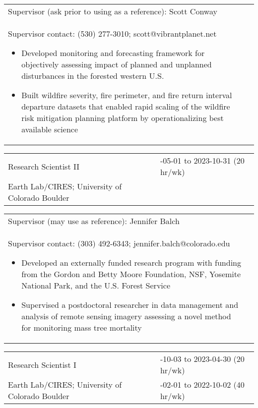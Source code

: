 \documentclass[10pt,english]{article}
\providecommand{\tabularnewline}{\\}
\begin{document}
\renewcommand{\arraystretch}{1.2}
\begin{tabularx}{\textwidth}{@{}>{\raggedright}p{6.25in} >{\raggedleft}X@{}}
\addtolength{\leftskip}{5ex}Supervisor (ask prior to using as a reference): Scott Conway \tabularnewline
\addtolength{\leftskip}{5ex}Supervisor contact: (530) 277-3010; scott@vibrantplanet.net
\begin{itemize}
\itemsep0em
\item{Developed monitoring and forecasting framework for objectively assessing impact of planned and unplanned disturbances in the forested western U.S.}
\item{Built wildfire severity, fire perimeter, and fire return interval departure datasets that enabled rapid scaling of the wildfire risk mitigation planning platform by operationalizing best available science}
\end{itemize}
\end{tabularx}

\renewcommand{\arraystretch}{1.2}
\begin{tabularx}{\textwidth}{@{}>{\raggedright}p{3.75in} >{\raggedleft}X@{}}
Research Scientist II & 2023-05-01 to 2023-10-31 (20 hr/wk) \tabularnewline
Earth Lab/CIRES; University of Colorado Boulder & \tabularnewline
\end{tabularx}

\renewcommand{\arraystretch}{1.2}
\begin{tabularx}{\textwidth}{@{}>{\raggedright}p{6.25in} >{\raggedleft}X@{}}
\addtolength{\leftskip}{5ex}Supervisor (may use as reference): Jennifer Balch \tabularnewline
\addtolength{\leftskip}{5ex}Supervisor contact: (303) 492-6343; jennifer.balch@colorado.edu
\begin{itemize}
\itemsep0em
\item{Developed an externally funded research program with funding from the Gordon and Betty Moore Foundation, NSF, Yosemite National Park, and the U.S. Forest Service}
\item{Supervised a postdoctoral researcher in data management and analysis of remote sensing imagery assessing a novel method for monitoring mass tree mortality}
\end{itemize}
\end{tabularx}

\renewcommand{\arraystretch}{1.2}
\begin{tabularx}{\textwidth}{@{}>{\raggedright}p{3.75in} >{\raggedleft}X@{}}
Research Scientist I & 2022-10-03 to 2023-04-30 (20 hr/wk) \tabularnewline
Earth Lab/CIRES; University of Colorado Boulder & 2021-02-01 to 2022-10-02 (40 hr/wk) \tabularnewline
\end{tabularx}
\end{document}
